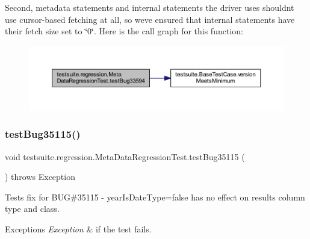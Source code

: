 Second, metadata statements and internal statements the driver uses shouldn\textquotesingle{}t use cursor-\/based fetching at all, so we\textquotesingle{}ve ensured that internal statements have their fetch size set to \char`\"{}0\char`\"{}. Here is the call graph for this function\+:
\nopagebreak
\begin{figure}[H]
\begin{center}
\leavevmode
\includegraphics[width=350pt]{classtestsuite_1_1regression_1_1_meta_data_regression_test_adb0cee1c23451feae0c5ee851ee0d5ba_cgraph}
\end{center}
\end{figure}
\mbox{\label{classtestsuite_1_1regression_1_1_meta_data_regression_test_a73c2bf687084e2bc8c33f56cce84bdbf}} 
\subsubsection{\texorpdfstring{test\+Bug35115()}{testBug35115()}}
{\footnotesize\ttfamily void testsuite.\+regression.\+Meta\+Data\+Regression\+Test.\+test\+Bug35115 (\begin{DoxyParamCaption}{ }\end{DoxyParamCaption}) throws Exception}

Tests fix for B\+UG\#35115 -\/ year\+Is\+Date\+Type=false has no effect on result\textquotesingle{}s column type and class.


\begin{DoxyExceptions}{Exceptions}
{\em Exception} & if the test fails. \\
\hline
\end{DoxyExceptions}
\mbox{\label{classtestsuite_1_1regression_1_1_meta_data_regression_test_a6b6d260139fb71288f93be76dac3f047}} 
